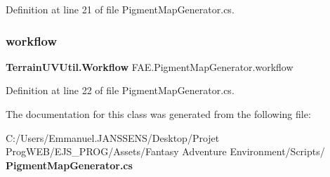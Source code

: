 Definition at line 21 of file Pigment\+Map\+Generator.\+cs.

\mbox{\label{class_f_a_e_1_1_pigment_map_generator_ac33391857fe6d31be6a0868790a93a4b}} 
\subsubsection{workflow}
{\footnotesize\ttfamily \textbf{ Terrain\+U\+V\+Util.\+Workflow} F\+A\+E.\+Pigment\+Map\+Generator.\+workflow}



Definition at line 22 of file Pigment\+Map\+Generator.\+cs.



The documentation for this class was generated from the following file\+:\begin{DoxyCompactItemize}
\item 
C\+:/\+Users/\+Emmanuel.\+J\+A\+N\+S\+S\+E\+N\+S/\+Desktop/\+Projet Prog\+W\+E\+B/\+E\+J\+S\+\_\+\+P\+R\+O\+G/\+Assets/\+Fantasy Adventure Environment/\+Scripts/\textbf{ Pigment\+Map\+Generator.\+cs}\end{DoxyCompactItemize}
